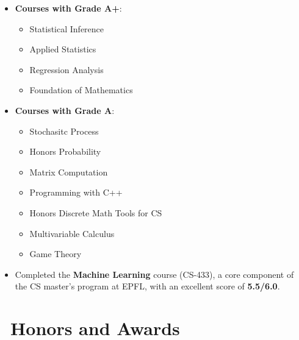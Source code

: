 \documentclass[colorlinks, linkcolor=blue]{resume}
\begin{document}
\begin{itemize}
    \item \textbf{Courses with Grade A+}:
    \begin{itemize}
        \item Statistical Inference
        \item Applied Statistics
        \item Regression Analysis
        \item Foundation of Mathematics
    \end{itemize}

    \item \textbf{Courses with Grade A}:
    \begin{itemize}
        \item Stochasitc Process
        \item Honors Probability
        \item Matrix Computation
        \item Programming with C++
        \item Honors Discrete Math Tools for CS
        \item Multivariable Calculus
        \item Game Theory
    \end{itemize}

    \item Completed the \textbf{Machine Learning} course (CS-433), a core component of the CS master's program at EPFL, with an excellent score of \textbf{5.5/6.0}.
\end{itemize}



\section{\faStar\ Honors and Awards}
\end{document}
